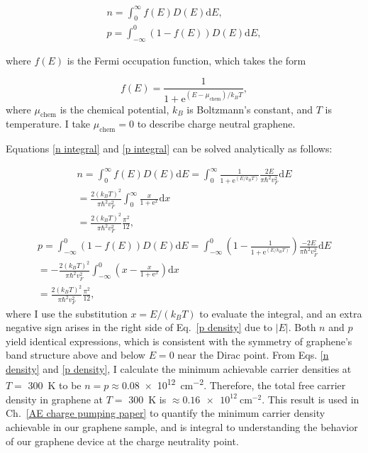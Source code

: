 \documentclass[double,12pt,1in,seploa]{beavtex}
\begin{document}
\begin{gather}
        n = \int_{0}^{\infty}f(E) D(E)\mathrm{d}E, \label{n integral} \\ 
        p = \int_{-\infty}^{0}(1- f(E)) D(E)\mathrm{d}E, \label{p integral}
\end{gather}

where $f(E)$ is the Fermi occupation function, which takes the form

\begin{equation}
    f(E) = \frac{1}{1+\mathrm{e}^{(E-\mu_{\mathrm{chem}})/k_B T}},
\end{equation}
where $\mu_{\mathrm{chem}}$ is the chemical potential, $k_B$ is Boltzmann's constant, and $T$ is temperature. I take $\mu_{\mathrm{chem}} = 0$ to describe charge neutral graphene. 

Equations \ref{n integral} and \ref{p integral} can be solved analytically as follows:

\begin{equation}
    \begin{split}
        n = \int_{0}^{\infty}f(E) D(E)\mathrm{d}E 
        = \int_{0}^{\infty}\frac{1}{1+\mathrm{e}^{(E/k_B T)}} \frac{2E}{\pi \hbar^2 v_F^2}\mathrm{d}E \\
        = \frac{2(k_B T)^2}{\pi \hbar^2 v_F^2}\int_{0}^{\infty}\frac{x}{1+\mathrm{e}^{x}}\mathrm{d}x \\
        = \frac{2(k_B T)^2}{\pi\hbar^2 v_F^2} \frac{\pi^2}{12}, \label{n density}
    \end{split}
\end{equation}
\begin{equation}
    \begin{split}
        p = \int_{-\infty}^{0}(1-f(E)) D(E)\mathrm{d}E 
        = \int_{-\infty}^{0}\left( 1 -\frac{1}{1+\mathrm{e}^{(E/k_B T)}} \right) \frac{-2E}{\pi \hbar^2 v_F^2}\mathrm{d}E \\
        = -\frac{2(k_B T)^2}{\pi \hbar^2 v_F^2}\int_{-\infty}^{0}\left(x - \frac{x}{1+\mathrm{e}^{x}}\right)\mathrm{d}x \\
        = \frac{2(k_B T)^2}{\pi\hbar^2 v_F^2} \frac{\pi^2}{12}, \label{p density}
    \end{split}
\end{equation}
where I use the substitution $x = E/(k_B T)$ to evaluate the integral, and an extra negative sign arises in the right side of Eq.\ \ref{p density} due to $|E|$. Both $n$ and $p$ yield identical expressions, which is consistent with the symmetry of graphene's band structure above and below $E = 0$ near the Dirac point. From Eqs. \ref{n density} and \ref{p density}, I calculate the minimum achievable carrier densities at $T = $ \SI{300}{\kelvin} to be $n = p \approx $\SI{0.08e12}{\centi\meter^{-2}}. Therefore, the total free carrier density in graphene at $T = $ \SI{300}{\kelvin} is $\approx \SI{0.16e12}{\centi\meter^{-2}}$. This result is used in Ch.\ \ref{AE charge pumping paper} to quantify the minimum carrier density achievable in our graphene sample, and is integral to understanding the behavior of our graphene device at the charge neutrality point.
\end{document}
